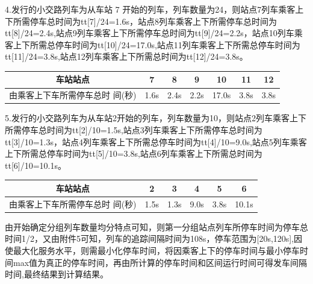 \documentclass[UTF8]{ctexart}
\begin{document}
4.发行的小交路列车为从车站 7 开始的列车，列车数量为24，则站点7列车乘客上下所需停车总时间为tt[7]/24=1.6s，站点8列车乘客上下所需停车总时间为 tt[8]/24=2.4s,站点9列车乘客上下所需停车总时间为tt[9]/24=2.2s，站点10列车乘客上下所需总停车时间为tt[10]/24=17.0s,站点11列车乘客上下所需总停车时间为tt[11]/24=3.8s,站点12列车乘客上下所需总时间为tt[12]/24=3.8s。\par
	\begin{center}
	\begin{tabular}{c|c|c|c|c|c|c} 
		车站站点 & 7 & 8 & 9 & 10 & 11 & 12 \\
		\hline
		由乘客上下车所需停车总时 间(秒) & 1.6s & 2.4s & 2.2s & 17.0s &3.8s & 3.8s \\	
	\end{tabular}
\end{center}\par
5.发行的小交路列车为从车站2开始的列车，列车数量为10，则站点2列车乘客上下所需停车总时间为tt[2]/10=1.5s,站点3列车乘客上下所需停车总时间为tt[3]/10=1.3s，站点4列车乘客上下所需总停车时间为tt[4]/10=9.0s,站点5列车乘客上下所需总停车时间为tt[5]/10=3.8s,站点6列车乘客上下所需总时间为tt[6]/10=10.1s。\par
	\begin{center}
	\begin{tabular}{c|c|c|c|c|c} 
		车站站点 & 2 & 3 & 4 & 5 & 6 \\
		\hline
		由乘客上下车所需停车总时 间(秒) & 1.5s & 1.3s & 9.0s & 3.8s & 10.1s \\	
	\end{tabular}
\end{center}\par
由开始确定分组列车数量均分特点可知，则第一分组站点列车所停车时间为停车总时间1/2，又由附件5可知，列车的追踪间隔时间为108s，停车范围为[20s,120s],因使最大化服务水平，则需最小化停车时间，将因乘客上下的停车时间与最小停车时间max值为真正的停车时间，再由所计算的停车时间和区间运行时间可得发车间隔时间,最终结果到计算结果。\par
\end{document}
